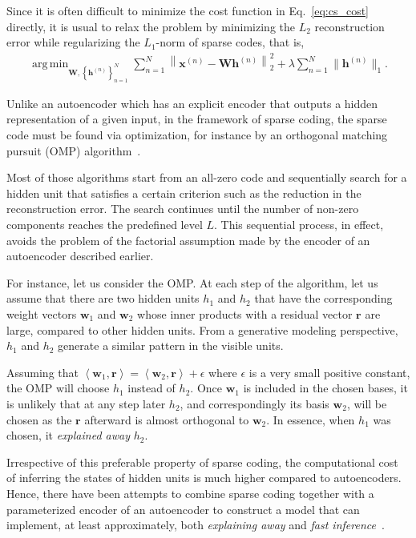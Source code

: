 \documentclass{now}
\newcommand{\vect}[1]{\mathbf{#1}}
\newcommand{\matr}[1]{\mathbf{#1}}
\newcommand{\vh}[0]{\vect{h}}
\newcommand{\vx}[0]{\vect{x}}
\newcommand{\vr}[0]{\vect{r}}
\newcommand{\vw}[0]{\vect{w}}
\newcommand{\mW}[0]{\matr{W}}
\DeclareMathOperator*{\argmin}{arg\,min}
\begin{document}
Since it is often difficult to minimize the cost function in
Eq.~\eqref{eq:cs_cost} directly, it is usual to relax the problem by minimizing
the $L_2$ reconstruction error while regularizing the $L_1$-norm of sparse
codes, that is,
\begin{align}
    \label{eq:sp_cost}
    \argmin_{\mW, \left\{ \vh^{(n)} \right\}_{n=1}^N }
    \sum_{n=1}^N \left\| \vx^{(n)} - \mW \vh^{(n)}
    \right\|_2^2 + \lambda \sum_{n=1}^N \| \vh^{(n)} \|_1.
\end{align}

Unlike an autoencoder which has an explicit encoder that outputs a hidden
representation of a given input, in the framework of sparse coding, the sparse
code must be found via optimization, for instance by an orthogonal matching
pursuit (OMP)
algorithm~\citep{Davis1994}.

Most of those algorithms start from an all-zero code and sequentially search for
a hidden unit that satisfies a certain criterion such as the reduction in the
reconstruction error. The search continues until the number of non-zero
components reaches the predefined level $L$.  This sequential process, in
effect, avoids the problem of the factorial assumption made by the encoder of an
autoencoder described earlier. 

For instance, let us consider the OMP. At each step of the algorithm, let us
assume that there are two hidden units $h_1$ and $h_2$ that have the
corresponding weight vectors $\vw_1$ and $\vw_2$ whose inner products with a
residual vector $\vr$ are large, compared to other hidden units. From a
generative modeling perspective, $h_1$ and $h_2$ generate a similar pattern in
the visible units.

Assuming that $\left< \vw_1, \vr\right> = \left< \vw_2, \vr\right> + \epsilon$
where $\epsilon$ is a very small positive constant, the OMP will choose $h_1$
instead of $h_2$. Once $\vw_1$ is included in the chosen bases, it is unlikely
that at any step later $h_2$, and correspondingly its basis $\vw_2$, will be
chosen as the $\vr$ afterward is almost orthogonal to $\vw_2$. In essence, when
$h_1$ was chosen, it \textit{explained away} $h_2$.

Irrespective of this preferable property of sparse coding, the computational
cost of inferring the states of hidden units is much higher compared to
autoencoders. Hence, there have been attempts to combine sparse coding together
with a parameterized encoder of an autoencoder to construct a model that can
implement, at least approximately, both \textit{explaining away} and
\textit{fast inference}~\citep[see, e.g.,][]{Kavukcuoglu2010,Gregor2010}.
\end{document}

